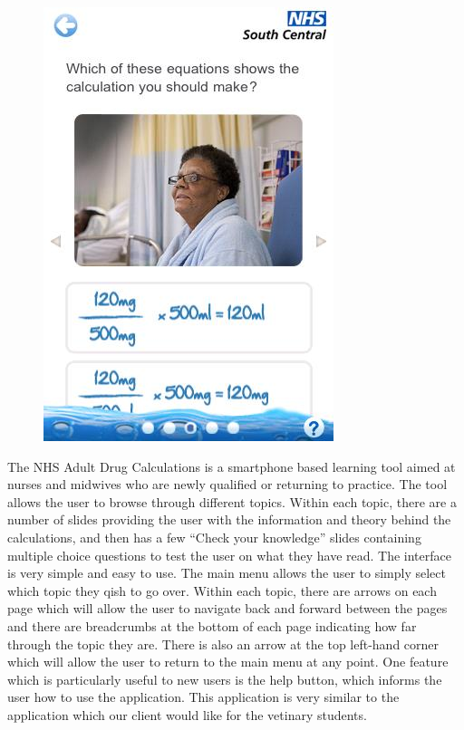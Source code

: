 \documentclass{l3proj}
\begin{document}
\begin{figure}[!htb]
  \includegraphics[width=\linewidth]{images/NHSDrugApp/NHSDrugApp4.png}
\endminipage
\end{figure}


The NHS Adult Drug Calculations is a smartphone based learning tool aimed at nurses and midwives who are newly qualified or returning to practice. The tool allows the user to browse through different topics. Within each topic, there are a number of slides providing the user with the information and theory behind the calculations, and then has a few ``Check your knowledge'' slides containing multiple choice questions to test the user on what they have read. The interface is very simple and easy to use. The main menu allows the user to simply select which topic they qish to go over. Within each topic, there are arrows on each page which will allow the user to navigate back and forward between the pages and there are breadcrumbs at the bottom of each page indicating how far through the topic they are.  There is also an arrow at the top left-hand corner which will allow the user to return to the main menu at any point. One feature which is particularly useful to new users is the help button, which informs the user how to use the application. This application is very similar to the application which our client would like for the vetinary students.
\end{document}
